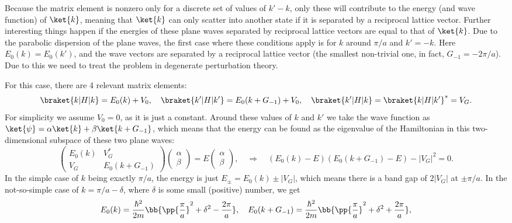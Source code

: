 \documentclass[main.tex]{subfiles}
\begin{document}
	Because the matrix element is nonzero only for a discrete set of values of $ k'-k $, only these will contribute to the energy (and wave function) of $ \ket{k} $, meaning that $ \ket{k} $ can only scatter into another state if it is separated by a reciprocal lattice vector. Further interesting things happen if the energies of these plane waves separated by reciprocal lattice vectors are equal to that of $ \ket{k} $. Due to the parabolic dispersion of the plane waves, the first case where these conditions apply is for $ k $ around $ \pi/a $ and $ k'=-k$. Here $ E_0(k) = E_0(k') $, and the wave vectors are separated by a reciprocal lattice vector (the smallest non-trivial one, in fact, $ G_{-1}=-2\pi/a $). Due to this we need to treat the problem in degenerate perturbation theory.
	
	For this case, there are 4 relevant matrix elements:
	\begin{align}
		\braket{k|H|k} = E_0(k) + V_0, \quad \braket{k'|H|k'} = E_0(k+G_{-1}) + V_0, \quad \braket{k'|H|k} = \braket{k|H|k'}^* = V_G.
	\end{align}
	For simplicity we assume $ V_0 = 0 $, as it is just a constant. Around these values of $ k $ and $ k' $ we take the wave function as $ \ket{\psi} = \alpha \ket{k} + \beta \ket{k+G_{-1}} $, which means that the energy can be found as the eigenvalue of the Hamiltonian in this two-dimensional subspace of these two plane waves:
	\begin{equation}
		\begin{pmatrix}
			E_0(k) & V_G^* \\ V_G & E_0(k+G_{-1})
		\end{pmatrix} \begin{pmatrix}
		\alpha \\ \beta
		\end{pmatrix} = E \begin{pmatrix}
		\alpha \\ \beta
		\end{pmatrix}, \quad \Rightarrow \quad (E_0(k)-E)(E_0(k+G_{-1})-E) - |V_G|^2 = 0.
	\end{equation}
	In the simple case of $ k $ being exactly $ \pi/a $, the energy is just $ E_{\pm} = E_0(k) \pm | V_G| $, which means there is a band gap of $ 2|V_G| $ at $ \pm \pi/a $. In the not-so-simple case of $ k = \pi/a - \delta $, where $ \delta $ is some small (positive) number, we get
	\begin{equation}
		E_0(k) = \frac{\hbar^2}{2m}\bb{\pp{\frac{\pi}{a}}^2 + \delta^2 - \frac{2\pi}{a}}, \quad E_0(k+G_{-1}) = \frac{\hbar^2}{2m} \bb{\pp{\frac{\pi}{a}}^2 + \delta^2 + \frac{2\pi}{a}},
	\end{equation}
\end{document}
